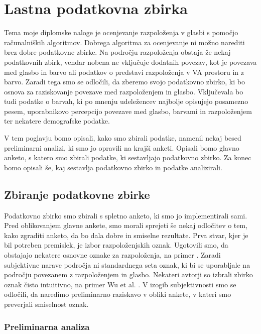 \documentclass[a4paper, 12pt]{book}
\begin{document}
{\begin{itemize}
\end{itemize}



\chapter{Lastna podatkovna zbirka}
\label{odatasetu}

Tema moje diplomske naloge je ocenjevanje razpoloženja v glasbi s pomočjo ra\-ču\-nal\-niš\-kih algoritmov. Dobrega algoritma za ocenjevanje ni možno narediti brez dobre podatkovne zbirke. Na področju razpoloženja obstaja že nekaj podatkovnih zbirk, vendar nobena ne vključuje dodatnih povezav, kot je povezava med glasbo in barvo ali podatkov o predstavi razpoloženja v VA prostoru in z barvo. Zaradi tega smo se odločili, da zberemo svojo podatkovno zbirko, ki bo osnova za raziskovanje povezave med razpoloženjem in glasbo. Vključevala bo tudi podatke o barvah, ki po mnenju udeležencev najbolje opisujejo posamezno pesem, uporabnikovo percepcijo povezave med glasbo, barvami in razpoloženjem ter nekatere demografske podatke.

V tem poglavju bomo opisali, kako smo zbirali podatke, namenil nekaj besed preliminarni analizi, ki smo jo opravili na krajši anketi. Opisali bomo glavno anketo, s katero smo zbirali podatke, ki sestavljajo podatkovno zbirko. Za konec bomo opisali še, kaj sestavlja podatkovno zbirko in podatke analizirali. 


\section{Zbiranje podatkovne zbirke}

Podatkovno zbirko smo zbirali s spletno anketo, ki smo jo implementirali sami. Pred oblikovanjem glavne ankete, smo morali sprejeti še nekaj odločitev o tem, kako zgraditi anketo, da bo dala dobre in smiselne rezultate. Prva stvar, kjer je bil potreben premislek, je izbor razpoloženjskih oznak. Ugotovili smo, da obstajajo nekatere osnovne oznake za razpoloženja, na primer \cite{dalgleish1999handbook}. Zaradi subjektivne narave področja ni standardnega seta oznak, ki bi se uporabljale na področju povezanem z razpoloženjem in glasbo. Nekateri avtorji so izbrali zbirko oznak čisto intuitivno, na primer Wu et al. \cite{Wu2013}. V izogib subjektivnosti smo se odločili, da naredimo preliminarno raziskavo v obliki ankete, v kateri smo preverjali smiselnost oznak. 

\subsection{Preliminarna analiza}
\label{preiliminarnaana}

}
\end{document}
